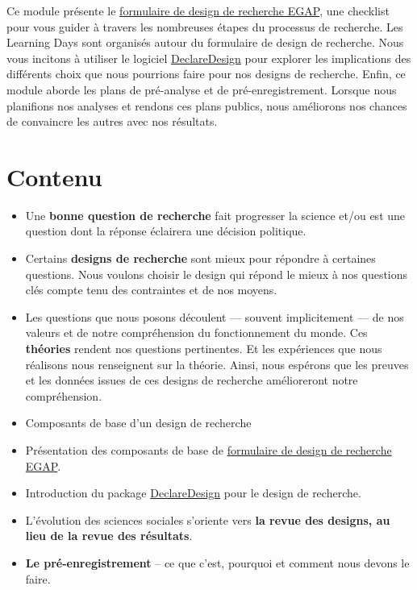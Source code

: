 \documentclass[
  12pt,
]{book}
\begin{document}
Ce module présente le \href{https://egap.github.io/learningdays-resources/Exercises/design-form.Rmd}{formulaire de design de recherche EGAP}, une checklist pour vous guider à travers les nombreuses étapes du processus de recherche. Les Learning Days sont organisés autour du formulaire de design de recherche. Nous vous incitons à utiliser le logiciel \href{https://declaredesign.org}{DeclareDesign} pour explorer les implications des différents choix que nous pourrions faire pour nos designs de recherche. Enfin, ce module aborde les plans de pré-analyse et de pré-enregistrement. Lorsque nous planifions nos analyses et rendons ces plans publics, nous améliorons nos chances de convaincre les autres avec nos résultats.

\hypertarget{contenu}{%
\section{Contenu}\label{contenu}}

\begin{itemize}
\item
  Une \textbf{bonne question de recherche} fait progresser la science et/ou est une question dont la réponse éclairera une décision politique.
\item
  Certains \textbf{designs de recherche} sont mieux pour répondre à certaines questions. Nous voulons choisir le design qui répond le mieux à nos questions clés compte tenu des contraintes et de nos moyens.
\item
  Les questions que nous posons découlent --- souvent implicitement --- de nos valeurs et de notre compréhension du fonctionnement du monde. Ces \textbf{théories} rendent nos questions pertinentes. Et les expériences que nous réalisons nous renseignent sur la théorie. Ainsi, nous espérons que les preuves et les données issues de ces designs de recherche amélioreront notre compréhension.
\item
  Composants de base d'un design de recherche
\item
  Présentation des composants de base de \href{https://egap.github.io/learningdays-resources/Exercises/design-form.html}{formulaire de design de recherche EGAP}.
\item
  Introduction du package \href{https://declaredesign.org}{DeclareDesign} pour le design de recherche.
\item
  L'évolution des sciences sociales s'oriente vers \textbf{la revue des designs, au lieu de la revue des résultats}.
\item
  \textbf{Le pré-enregistrement} -- ce que c'est, pourquoi et comment nous devons le faire.
\end{itemize}
\end{document}
